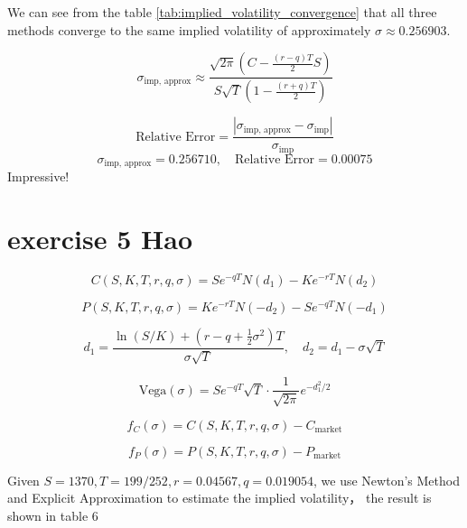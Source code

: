 \documentclass{article}
\begin{document}
We can see from the table \ref{tab:implied_volatility_convergence} that all three methods converge to the same implied volatility of approximately \( \sigma \approx 0.256903 \).

\[
    \sigma_{\text{imp, approx}} \approx
    \frac{ \sqrt{2\pi} \left( C - \frac{(r - q)T}{2} S \right) }
    { S \sqrt{T} \left( 1 - \frac{(r + q)T}{2} \right) }
\]

\[
    \text{Relative Error} =
    \frac{ \left| \sigma_{\text{imp, approx}} - \sigma_{\text{imp}} \right| }
    { \sigma_{\text{imp}} }
\]
\[
    \sigma_{\text{imp, approx}} = 0.256710, \quad
    \text{Relative Error} = 0.00075
\]
Impressive!


\section{exercise 5 Hao}
\[
    C(S, K, T, r, q, \sigma) = S e^{-qT} N(d_1) - K e^{-rT} N(d_2)
\]

\[
    P(S, K, T, r, q, \sigma) = K e^{-rT} N(-d_2) - S e^{-qT} N(-d_1)
\]

\[
    d_1 = \frac{\ln(S/K) + (r - q + \frac{1}{2}\sigma^2)T}{\sigma \sqrt{T}}, \quad
    d_2 = d_1 - \sigma \sqrt{T}
\]

\[
    \text{Vega}(\sigma) = S e^{-qT} \sqrt{T} \cdot \frac{1}{\sqrt{2\pi}} e^{-d_1^2 / 2}
\]

\[
    f_C(\sigma) = C(S, K, T, r, q, \sigma) - C_{\text{market}}
\]

\[
    f_P(\sigma) = P(S, K, T, r, q, \sigma) - P_{\text{market}}
\]

Given \(S=1370, T = 199/252, r=0.04567, q=0.019054 \), we use Newton's Method and Explicit Approximation to estimate the implied volatility， the result is shown in table 6
\end{document}
